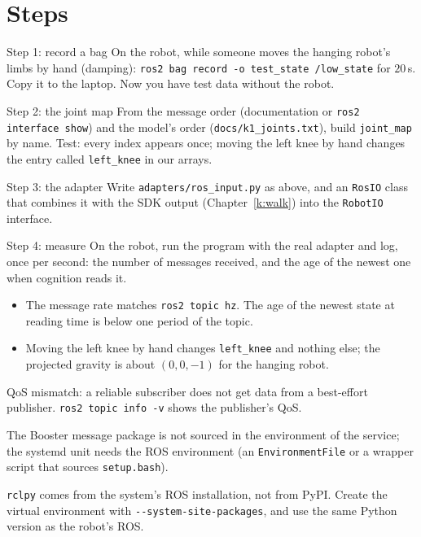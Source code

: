 \section*{Steps}
\begin{stepbox}{Step 1: record a bag}
On the robot, while someone moves the hanging robot's limbs by hand (damping): \verb!ros2 bag record -o test_state /low_state! for $20$\,s. Copy it to the laptop. Now you have test data without the robot.
\end{stepbox}
\begin{stepbox}{Step 2: the joint map}
From the message order (documentation or \texttt{ros2 interface show}) and the model's order (\texttt{docs/k1\_joints.txt}), build \texttt{joint\_map} by name. Test: every index appears once; moving the left knee by hand changes the entry called \texttt{left\_knee} in our arrays.
\end{stepbox}
\begin{stepbox}{Step 3: the adapter}
Write \texttt{adapters/ros\_input.py} as above, and an \texttt{RosIO} class that combines it with the SDK output (Chapter~\ref{k:walk}) into the \texttt{RobotIO} interface.
\end{stepbox}
\begin{stepbox}{Step 4: measure}
On the robot, run the program with the real adapter and log, once per second: the number of messages received, and the age of the newest one when cognition reads it.
\end{stepbox}

\begin{checkbox}
\begin{itemize}[nosep]
  \item The message rate matches \verb!ros2 topic hz!. The age of the newest state at reading time is below one period of the topic.
  \item Moving the left knee by hand changes \texttt{left\_knee} and nothing else; the projected gravity is about $(0,0,-1)$ for the hanging robot.
\end{itemize}
\end{checkbox}

\begin{troublebox}
\begin{description}[leftmargin=0.6cm,nosep]
  \item[No messages, but \texttt{ros2 topic echo} works] QoS mismatch: a reliable subscriber does not get data from a best-effort publisher. \verb!ros2 topic info -v! shows the publisher's QoS.
  \item[\texttt{ModuleNotFoundError: booster\_interface}] The Booster message package is not sourced in the environment of the service; the systemd unit needs the ROS environment (an \texttt{EnvironmentFile} or a wrapper script that sources \texttt{setup.bash}).
  \item[The virtual environment cannot see \texttt{rclpy}] \texttt{rclpy} comes from the system's ROS installation, not from PyPI. Create the virtual environment with \verb!--system-site-packages!, and use the same Python version as the robot's ROS.
\end{description}
\end{troublebox}

